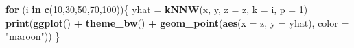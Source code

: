 \documentclass[]{article}
\newenvironment{Shaded}{\begin{snugshade}}{\end{snugshade}}
\newcommand{\KeywordTok}[1]{\textcolor[rgb]{0.13,0.29,0.53}{\textbf{#1}}}
\newcommand{\DataTypeTok}[1]{\textcolor[rgb]{0.13,0.29,0.53}{#1}}
\newcommand{\DecValTok}[1]{\textcolor[rgb]{0.00,0.00,0.81}{#1}}
\newcommand{\StringTok}[1]{\textcolor[rgb]{0.31,0.60,0.02}{#1}}
\newcommand{\ControlFlowTok}[1]{\textcolor[rgb]{0.13,0.29,0.53}{\textbf{#1}}}
\newcommand{\OperatorTok}[1]{\textcolor[rgb]{0.81,0.36,0.00}{\textbf{#1}}}
\newcommand{\NormalTok}[1]{#1}
\begin{document}
\begin{Shaded}
\begin{Highlighting}[]
\ControlFlowTok{for}\NormalTok{ (i }\ControlFlowTok{in} \KeywordTok{c}\NormalTok{(}\DecValTok{10}\NormalTok{,}\DecValTok{30}\NormalTok{,}\DecValTok{50}\NormalTok{,}\DecValTok{70}\NormalTok{,}\DecValTok{100}\NormalTok{))\{}
\NormalTok{  yhat =}\StringTok{ }\KeywordTok{kNNW}\NormalTok{(x, y, }\DataTypeTok{z =}\NormalTok{ z, }\DataTypeTok{k =}\NormalTok{ i, }\DataTypeTok{p =} \DecValTok{1}\NormalTok{)}
  \KeywordTok{print}\NormalTok{(}\KeywordTok{ggplot}\NormalTok{() }\OperatorTok{+}\StringTok{ }\KeywordTok{theme_bw}\NormalTok{() }\OperatorTok{+}
\StringTok{    }\KeywordTok{geom_point}\NormalTok{(}\KeywordTok{aes}\NormalTok{(}\DataTypeTok{x =}\NormalTok{ z, }\DataTypeTok{y =}\NormalTok{ yhat), }\DataTypeTok{color =} \StringTok{"maroon"}\NormalTok{))}
\NormalTok{\}}
\end{Highlighting}
\end{Shaded}
\end{document}
